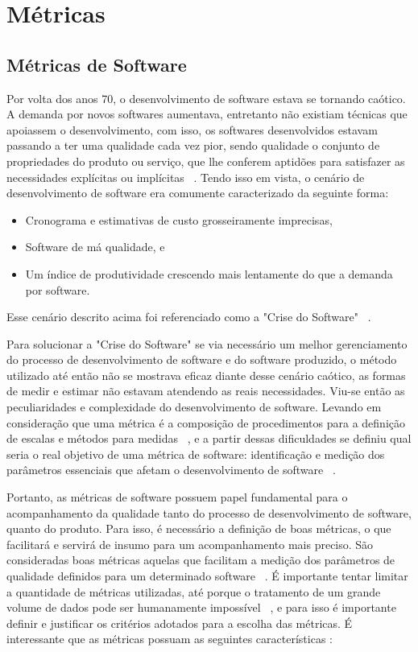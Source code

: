 \chapter{Métricas} \label{chap:metricas}

\section{Métricas de Software}

Por volta dos anos 70, o desenvolvimento de software estava se tornando caótico. A demanda por novos softwares aumentava,
entretanto não existiam técnicas que apoiassem o desenvolvimento, com isso, os softwares desenvolvidos estavam passando
a ter uma qualidade cada vez pior, sendo qualidade o conjunto de propriedades do produto ou serviço, que lhe conferem 
aptidões para satisfazer as necessidades explícitas ou implícitas ~\cite{iso:8402}. Tendo isso em vista, o cenário de
desenvolvimento de software era comumente caracterizado da seguinte forma:

\begin{itemize}
  \item Cronograma e estimativas de custo grosseiramente imprecisas,
  \item Software de má qualidade, e
  \item Um índice de produtividade crescendo mais lentamente do que a demanda por software.
\end{itemize}

Esse cenário descrito acima foi referenciado como a "Crise do Software" ~\cite{arthur85}.

Para solucionar a "Crise do Software"  se via necessário um melhor gerenciamento do processo de desenvolvimento de software
e do software produzido, o método utilizado até então não se mostrava eficaz diante desse cenário caótico, as formas de medir 
e estimar não estavam atendendo as reais necessidades. Viu-se então as peculiaridades e complexidade do desenvolvimento de 
software. Levando em consideração que uma métrica é a composição de procedimentos para a definição de escalas e métodos para 
medidas ~\cite{iso:9126-1}, e a partir dessas dificuldades se definiu qual seria o real objetivo de uma métrica de software: 
identificação e medição dos parâmetros essenciais que afetam o desenvolvimento de software ~\cite{mills88}.

Portanto, as métricas de software possuem papel fundamental para o acompanhamento da qualidade tanto do processo de
desenvolvimento de software, quanto do produto. Para isso, é necessário a definição de boas métricas, o que facilitará
e servirá de insumo para um acompanhamento mais preciso. São consideradas boas métricas aquelas que facilitam a medição dos 
parâmetros de qualidade definidos para um determinado software ~\cite{mills88}. É importante tentar limitar a quantidade
de métricas utilizadas, até porque o tratamento de um grande volume de dados pode ser humanamente impossível 
~\cite{meirelles2013}, e para isso é importante definir e justificar os critérios adotados para a escolha das métricas.
É interessante que as métricas possuam as seguintes características \cite{fenton&pfleenger98,mills88}:

